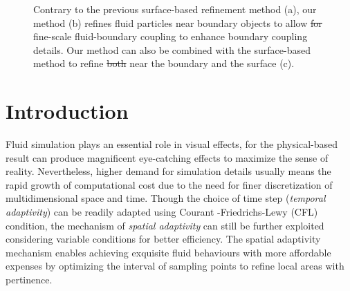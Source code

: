 \documentclass[VANCOUVER,STIX1COL]{WileyNJD-v2}
\providecommand{\DIFadd}[1]{{\protect\color{blue}\uwave{#1}}} %
\providecommand{\DIFdel}[1]{{\protect\color{red}\sout{#1}}}                      %
\providecommand{\DIFaddbegin}{} %
\providecommand{\DIFaddend}{} %
\providecommand{\DIFaddFL}[1]{\DIFadd{#1}} %
\providecommand{\DIFdelFL}[1]{\DIFdel{#1}} %
\providecommand{\DIFaddbeginFL}{} %
\providecommand{\DIFaddendFL}{} %
\providecommand{\DIFdelbeginFL}{} %
\providecommand{\DIFdelendFL}{} %
\begin{document}
\begin{figure}[htbp]

\centering
{}
\vspace{-0.7\baselineskip}
\caption{Contrary to the previous surface-based refinement method (a), our method (b) refines fluid particles near boundary objects to allow \DIFdelbeginFL \DIFdelFL{for }\DIFdelendFL \DIFaddbeginFL \DIFaddFL{the }\DIFaddendFL fine-scale fluid-boundary coupling to enhance boundary coupling details. Our method can also be combined with the surface-based method to refine \DIFdelbeginFL \DIFdelFL{both }\DIFdelendFL near the boundary and the surface (c).}
\label{fig:refine}

\end{figure}

\section{Introduction}
Fluid simulation plays an essential role in visual effects, for the physical-based result can produce magnificent eye-catching effects to maximize the sense of reality. Nevertheless, higher demand for simulation details usually means the rapid growth of computational cost due to the need for \DIFaddbegin \DIFadd{the }\DIFaddend finer discretization of multidimensional space and time. Though the choice of time step (\emph{temporal adaptivity}) can be readily adapted using Courant
-Friedrichs-Lewy (CFL) condition, the mechanism of \emph{spatial adaptivity} can still be further exploited considering variable conditions for better efficiency. The spatial adaptivity mechanism enables achieving exquisite fluid behaviours with more affordable expenses by optimizing the interval of sampling points to refine local areas with pertinence.
\end{document}
